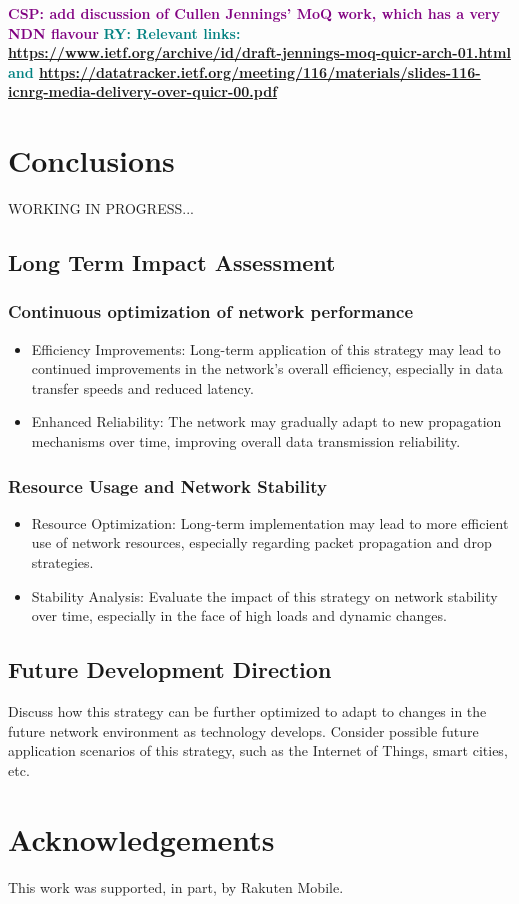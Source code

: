 \documentclass[10pt,conference]{IEEEtran}
\newcommand{\csp}[1]{\textbf{\textcolor{purple}{CSP: #1}}}
\newcommand{\ryo}[1]{\textbf{\textcolor{teal}{RY: #1}}}
\begin{document}
\csp{add discussion of Cullen Jennings' MoQ work, which has a very NDN flavour}
\ryo{Relevant links: \url{https://www.ietf.org/archive/id/draft-jennings-moq-quicr-arch-01.html} and \url{https://datatracker.ietf.org/meeting/116/materials/slides-116-icnrg-media-delivery-over-quicr-00.pdf}}

\section{Conclusions}
\label{sec:conclusion}

WORKING IN PROGRESS...
\subsection{Long Term Impact Assessment}
\subsubsection{Continuous optimization of network performance}
\begin{itemize}
    \item Efficiency Improvements: Long-term application of this strategy may lead to continued improvements in the network's overall efficiency, especially in data transfer speeds and reduced latency.
    \item Enhanced Reliability: The network may gradually adapt to new propagation mechanisms over time, improving overall data transmission reliability.
\end{itemize}

\subsubsection{Resource Usage and Network Stability}
\begin{itemize}
    \item Resource Optimization: Long-term implementation may lead to more efficient use of network resources, especially regarding packet propagation and drop strategies.
    \item Stability Analysis: Evaluate the impact of this strategy on network stability over time, especially in the face of high loads and dynamic changes.
\end{itemize}

\subsection{Future Development Direction}
Discuss how this strategy can be further optimized to adapt to changes in the future network environment as technology develops. Consider possible future application scenarios of this strategy, such as the Internet of Things, smart cities, etc.


\section*{Acknowledgements}

This work was supported, in part, by Rakuten Mobile.



\end{document}
